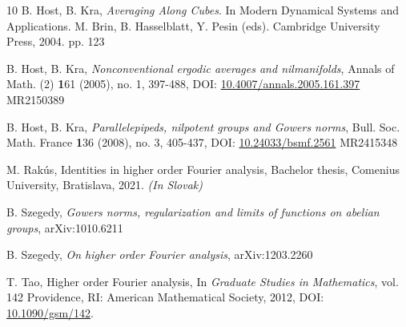 \documentclass{amsart}
\theoremstyle{definition}
\theoremstyle{remark}
\numberwithin{equation}{section}
\begin{document}
\begin{thebibliography}{10}
 B. Host, B. Kra, \textit{Averaging Along Cubes}. In Modern Dynamical Systems and Applications. M. Brin, B. Hasselblatt, Y. Pesin (eds). Cambridge University Press, 2004. pp. 123

 B. Host, B. Kra, \textit{Nonconventional ergodic averages and nilmanifolds}, Annals of Math. (2) {\textbf 161} (2005), no. 1, 397-488, DOI: \href{https://doi.org/10.4007/annals.2005.161.397}{10.4007/annals.2005.161.397} MR2150389 

 B. Host, B. Kra, \textit{Parallelepipeds, nilpotent groups and Gowers norms},  Bull. Soc. Math. France {\textbf 136} (2008), no. 3, 405-437, DOI: \href{https://doi.org/10.24033/bsmf.2561}{10.24033/bsmf.2561} MR2415348


 M. Rak\'us, Identities in higher order Fourier analysis, Bachelor thesis,
Comenius University, Bratislava, 2021. \textit{(In Slovak)}

 B. Szegedy, \textit{Gowers norms, regularization and limits of functions on abelian groups}, arXiv:1010.6211 

 B. Szegedy, \textit{On higher order Fourier analysis}, arXiv:1203.2260 

 T. Tao, Higher order Fourier analysis, In \textit{Graduate Studies in Mathematics}, vol. 142 Providence, RI: American Mathematical Society, 2012, DOI: \href{https://doi.org/10.1090/gsm/142}{10.1090/gsm/142}. 



\end{thebibliography}
\end{document}
